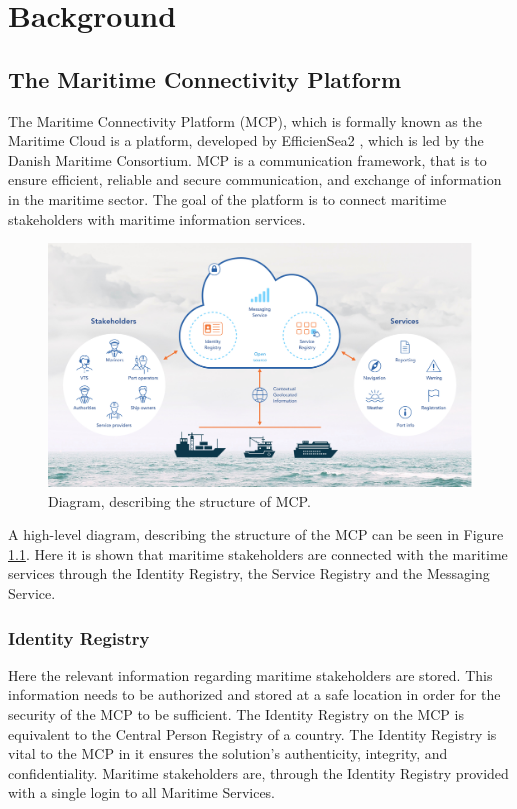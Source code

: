 \chapter{Background}

\section{The Maritime Connectivity Platform}
The Maritime Connectivity Platform (MCP), which is formally known as the Maritime Cloud is a platform, developed by EfficienSea2 \cite{efficienSea2}, which is led by the Danish Maritime Consortium. MCP is a communication framework, that is to ensure efficient, reliable and secure communication, and exchange of information in the maritime sector.
The goal of the platform is to connect maritime stakeholders with maritime information services.
\begin{figure}[H]
	\includegraphics[width=1\textwidth]{figures/MCPStructure}
	\caption{Diagram, describing the structure of MCP. \cite{efficienSea2}}
	\label{fig:MCPStruct}
\end{figure}\noindent
A high-level diagram, describing the structure of the MCP can be seen in Figure \ref{fig:MCPStruct}. Here it is shown that maritime stakeholders are connected with the maritime services through the Identity Registry, the Service Registry and the Messaging Service.

\subsection{Identity Registry}
Here the relevant information regarding maritime stakeholders are stored. This information needs to be authorized and stored at a safe location in order for the security of the MCP to be sufficient. The Identity Registry on the MCP is equivalent to the Central Person Registry of a country. The Identity Registry is vital to the MCP in it ensures the solution's authenticity, integrity, and confidentiality. Maritime stakeholders are, through the Identity Registry provided with a single login to all Maritime Services.\cite{efficienSea2}
